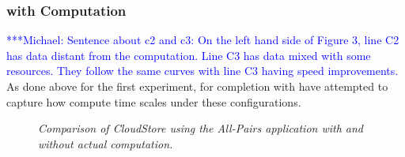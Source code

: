 \documentclass{rspublic}
\newcommand{\micnote}[1]{ {\textcolor{blue} { ***Michael: #1 }}}
\begin{document}
\subsubsection{with Computation} \micnote{Sentence about c2 and c3: On
the left hand side of Figure 3, line C2 has data distant from the
computation. Line C3 has data mixed with some resources. They follow
the same curves with line C3 having speed improvements.} As done above
for the first experiment, for completion with have attempted to capture
how compute time scales under these configurations.
\begin{center}
\begin{figure}
\caption{\textit{Comparison of CloudStore using the All-Pairs
application with and without actual computation.}}
\label{experiment4}
\end{figure}
\end{center}
\end{document}
